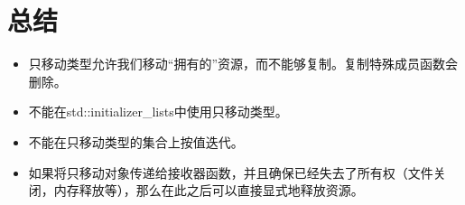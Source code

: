\section{总结}
\begin{itemize}
	\item 只移动类型允许我们移动“拥有的”资源，而不能够复制。复制特殊成员函数会删除。
	\item 不能在std::initializer_lists中使用只移动类型。
	\item 不能在只移动类型的集合上按值迭代。
	\item 如果将只移动对象传递给接收器函数，并且确保已经失去了所有权（文件关闭，内存释放等），那么在此之后可以直接显式地释放资源。
\end{itemize}


